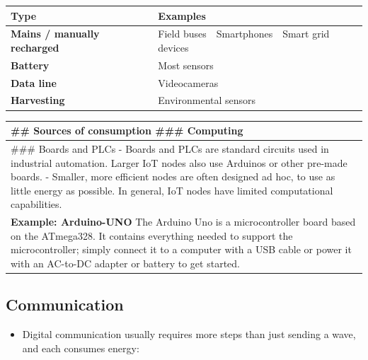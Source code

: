 \documentclass[a4paper, 12pt]{book} %
\begin{document}
\begin{longtable}[]{@{}
  >{\raggedright\arraybackslash}p{}
  >{\raggedright\arraybackslash}p{}@{}}
\toprule\noalign{}
\begin{minipage}[b]{\linewidth}\raggedright
Type
\end{minipage} & \begin{minipage}[b]{\linewidth}\raggedright
Examples
\end{minipage} \\
\midrule\noalign{}
\endhead
\bottomrule\noalign{}
\endlastfoot
\textbf{Mains / manually recharged} & Field buses Smartphones Smart grid
devices \\
\textbf{Battery} & Most sensors \\
\textbf{Data line} & Videocameras \\
\textbf{Harvesting} & Environmental sensors \\
\end{longtable}

\begin{longtable}[]{@{}
  >{\raggedright\arraybackslash}p{}@{}}
\toprule\noalign{}
\begin{minipage}[b]{\linewidth}\raggedright
\#\# Sources of consumption \#\#\# Computing
\end{minipage} \\
\midrule\noalign{}
\endhead
\bottomrule\noalign{}
\endlastfoot
\#\#\# Boards and PLCs - Boards and PLCs are standard circuits used in
industrial automation. Larger IoT nodes also use Arduinos or other
pre-made boards. - Smaller, more efficient nodes are often designed ad
hoc, to use as little energy as possible. In general, IoT nodes have
limited computational capabilities. \\
\textbf{Example: Arduino-UNO} The Arduino Uno is a microcontroller board
based on the ATmega328. It contains everything needed to support the
microcontroller; simply connect it to a computer with a USB cable or
power it with an AC-to-DC adapter or battery to get started. \\
\end{longtable}

\subsection{Communication}\label{communication}

\begin{itemize}
\tightlist
\item
  Digital communication usually requires more steps than just sending a
  wave, and each consumes energy:\\
\end{itemize}
\end{document}
